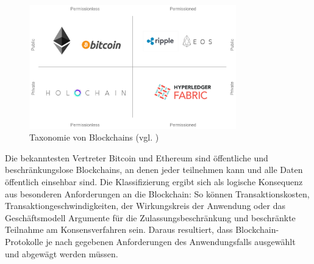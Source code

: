 \begin{figure}[htbp]
 \centering
 \includegraphics[width=0.8\textwidth]{gfx/taxonomy.png}
 \caption{Taxonomie von Blockchains (vgl. \cite{daniels2018})}
 \label{fig:chapter02:taxonomy}
\end{figure}

Die bekanntesten Vertreter Bitcoin und Ethereum sind öffentliche und beschränkungslose Blockchains, an denen jeder teilnehmen kann und alle Daten öffentlich einsehbar sind. Die Klassifizierung ergibt sich als logische Konsequenz aus besonderen Anforderungen an die Blockchain: So können Transaktionskosten, Transaktiongeschwindigkeiten, der Wirkungskreis der Anwendung oder das Geschäftsmodell Argumente für die Zulassungsbeschränkung und beschränkte Teilnahme am Konsensverfahren sein. Daraus resultiert, dass Blockchain-Protokolle je nach gegebenen Anforderungen des Anwendungsfalls ausgewählt und abgewägt werden müssen.

